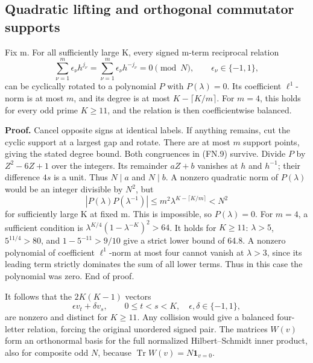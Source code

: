 \subsection{Quadratic lifting and orthogonal commutator supports}\label{floquet:quadratic-lifting-and-orthogonal-commutator-supports}

\begin{lemma}[lifting]\label{pass1:ch07_floquet_resonance-2} Fix m. For all sufficiently large K, every signed m-term reciprocal relation \[
 \sum_{\nu=1}^m\epsilon_\nu h^{j_\nu}
 =\sum_{\nu=1}^m\epsilon_\nu h^{-j_\nu}=0\pmod N,
 \qquad \epsilon_\nu\in\{-1,1\},                               \tag{FN.9}
\] can be cyclically rotated to a polynomial \(P\) with \(P(\lambda)=0\). Its coefficient \(\ell^1\)-norm is at most \(m\), and its degree is at most \(K-\lceil K/m\rceil\). For \(m=4\), this holds for every odd prime \(K\geq11\), and the relation is then coefficientwise balanced.
\end{lemma}

\textbf{Proof.} Cancel opposite signs at identical labels. If anything remains, cut the cyclic support at a largest gap and rotate. There are at most \(m\) support points, giving the stated degree bound. Both congruences in (FN.9) survive. Divide \(P\) by \(Z^2-6Z+1\) over the integers. Its remainder \(aZ+b\) vanishes at \(h\) and \(h^{-1}\); their difference \(4s\) is a unit. Thus \(N\mid a\) and \(N\mid b\). A nonzero quadratic norm of \(P(\lambda)\) would be an integer divisible by \(N^2\), but \[
 |P(\lambda)P(\lambda^{-1})|
 \leq m^2\lambda^{K-\lceil K/m\rceil}<N^2                       \tag{FN.10}
\] for sufficiently large K at fixed m. This is impossible, so \(P(\lambda)=0\). For \(m=4\), a sufficient condition is \(\lambda^{K/4}(1-\lambda^{-K})^2>64\). It holds for \(K\geq11\): \(\lambda>5\), \(5^{11/4}>80\), and \(1-5^{-11}>9/10\) give a strict lower bound of 64.8. A nonzero polynomial of coefficient \(\ell^1\)-norm at most four cannot vanish at \(\lambda>3\), since its leading term strictly dominates the sum of all lower terms. Thus in this case the polynomial was zero. End of proof.

It follows that the \(2K(K-1)\) vectors \[
 \epsilon v_t+\delta v_s,\qquad 0\leq t<s<K,\quad
 \epsilon,\delta\in\{-1,1\},                                  \tag{FN.11}
\] are nonzero and distinct for \(K\geq11\). Any collision would give a balanced four-letter relation, forcing the original unordered signed pair. The matrices \(W(v)\) form an orthonormal basis for the full normalized Hilbert--Schmidt inner product, also for composite odd \(N\), because \(\operatorname{Tr}W(v)=N\mathbf1_{v=0}\).

